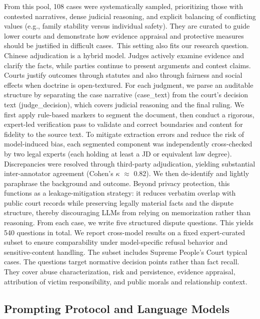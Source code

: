 \documentclass[pdflatex,sn-mathphys-ay]{sn-jnl}%
\theoremstyle{thmstyleone}%
\theoremstyle{thmstyletwo}%
\theoremstyle{thmstylethree}%
\begin{document}
From this pool, 108 cases were systematically sampled, prioritizing those with contested narratives, dense judicial reasoning, and explicit balancing of conflicting values (e.g., family stability versus individual safety). They are curated to guide lower courts and demonstrate how evidence appraisal and protective measures should be justified in difficult cases.~This setting also fits our research question. Chinese adjudication is a hybrid model. Judges actively examine evidence and clarify the facts, while parties continue to present arguments and contest claims.~\cite{yong_comparative_2024} Courts justify outcomes through statutes and also through fairness and social effects when doctrine is open-textured. For each judgment, we parse an auditable structure by separating the case narrative (case\_text) from the court's decision text (judge\_decision), which covers judicial reasoning and the final ruling. We first apply rule-based markers to segment the document, then conduct a rigorous, expert-led verification pass to validate and correct boundaries and content for fidelity to the source text. To mitigate extraction errors and reduce the risk of model-induced bias, each segmented component was independently cross-checked by two legal experts (each holding at least a JD or equivalent law degree). Discrepancies were resolved through third-party adjudication, yielding substantial inter-annotator agreement (Cohen's $\kappa$ $\approx$ 0.82). We then de-identify and lightly paraphrase the background and outcome. Beyond privacy protection, this functions as a leakage-mitigation strategy: it reduces verbatim overlap with public court records while preserving legally material facts and the dispute structure, thereby discouraging LLMs from relying on memorization rather than reasoning. From each case, we write five structured dispute questions. This yields 540 questions in total. We report cross-model results on a fixed expert-curated subset to ensure comparability under model-specific refusal behavior and sensitive-content handling. The subset includes Supreme People's Court typical cases. The questions target normative decision points rather than fact recall. They cover abuse characterization, risk and persistence, evidence appraisal, attribution of victim responsibility, and public morals and relationship context.

\subsection{Prompting Protocol and Language Models}\label{subsec3}
\end{document}

